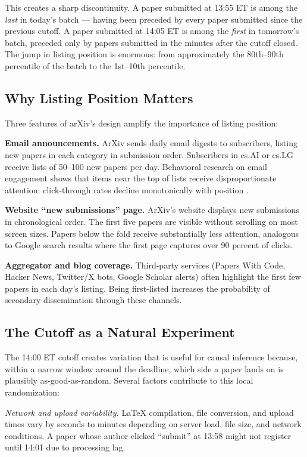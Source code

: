 \documentclass[12pt]{article}
\begin{document}
This creates a sharp discontinuity. A paper submitted at 13:55 ET is among the \textit{last} in today's batch --- having been preceded by every paper submitted since the previous cutoff. A paper submitted at 14:05 ET is among the \textit{first} in tomorrow's batch, preceded only by papers submitted in the minutes after the cutoff closed. The jump in listing position is enormous: from approximately the 80th--90th percentile of the batch to the 1st--10th percentile.

\subsection{Why Listing Position Matters}

Three features of arXiv's design amplify the importance of listing position:

\textbf{Email announcements.} ArXiv sends daily email digests to subscribers, listing new papers in each category in submission order. Subscribers in cs.AI or cs.LG receive lists of 50--100 new papers per day. Behavioral research on email engagement shows that items near the top of lists receive disproportionate attention: click-through rates decline monotonically with position \citep{feenberg2017}.

\textbf{Website ``new submissions'' page.} ArXiv's website displays new submissions in chronological order. The first five papers are visible without scrolling on most screen sizes. Papers below the fold receive substantially less attention, analogous to Google search results where the first page captures over 90 percent of clicks.

\textbf{Aggregator and blog coverage.} Third-party services (Papers With Code, Hacker News, Twitter/X bots, Google Scholar alerts) often highlight the first few papers in each day's listing. Being first-listed increases the probability of secondary dissemination through these channels.

\subsection{The Cutoff as a Natural Experiment}

The 14:00 ET cutoff creates variation that is useful for causal inference because, within a narrow window around the deadline, which side a paper lands on is plausibly as-good-as-random. Several factors contribute to this local randomization:

\textit{Network and upload variability.} LaTeX compilation, file conversion, and upload times vary by seconds to minutes depending on server load, file size, and network conditions. A paper whose author clicked ``submit'' at 13:58 might not register until 14:01 due to processing lag.
\end{document}
